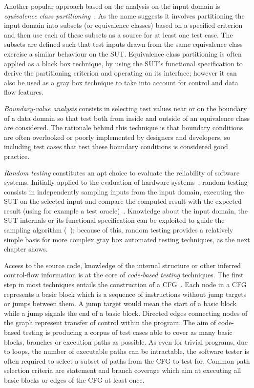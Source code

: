 Another popular approach based on the analysis on the input domain is
\emph{equivalence class partitioning}~\cite{richardson1981partition}. As the
name suggests it involves partitioning the input domain into subsets (or
equivalence classes) based on a specified criterion and then use each of these
subsets as a source for at least one test case. The subsets are defined such
that test inputs drawn from the same equivalence class exercise a similar
behaviour on the \ac{SUT}. Equivalence class partitioning is often applied as a
black box technique, by using the \ac{SUT}'s functional specification to derive
the partitioning criterion and operating on its interface; however it can also
be used as a gray box technique to take into account for control and data flow
features.

\emph{Boundary-value analysis} consists in selecting test values near or on the
boundary of a data domain so that test both from inside and outside of an
equivalence class are considered. The rationale behind this technique is that
boundary conditions are often overlooked or poorly implemented by designers and
developers, so including test cases that test these boundary conditions is
considered good practice.

\emph{Random testing} constitutes an apt choice to evaluate the reliability of
software systems. Initially applied to the evaluation of hardware
systems~\cite{breuer1971random}, random testing consists in independently
sampling inputs from the input domain, executing the \ac{SUT} on the selected
input and compare the computed result with the expected result (using for
example a test oracle)~\cite{beizer1995BTT}. Knowledge about the input domain,
the \ac{SUT} internals or its functional specification can be exploited to guide
the sampling algorithm (\eg~\cite{Chen2004AdaptiveRT}); because of this, random
testing provides a relatively simple basis for more complex gray box automated
testing techniques, as the next chapter shows.

Access to the source code, knowledge of the internal structure or other inferred
control-flow information is at the core of \emph{code-based testing} techniques.
The first step in most techniques entails the construction of a
\ac{CFG}~\cite{Allen1970CFA, allen1972graph}. Each node in a \ac{CFG} represents
a basic block which is a sequence of instructions without jump targets or jumps
between them.  A jump target would mean the start of a basic block while a jump
signals the end of a basic block. Directed edges connecting nodes of the graph
represent transfer of control within the program. The aim of code-based testing
is producing a corpus of test cases able to cover as many basic blocks, branches
or execution paths as possible. As even for trivial programs, due to loops, the
number of executable paths can be intractable, the software tester is often
required to select a subset of paths from the \ac{CFG} to test for. Common path
selection criteria are statement and branch coverage which aim at executing all
basic blocks or edges of the \ac{CFG} at least once.

